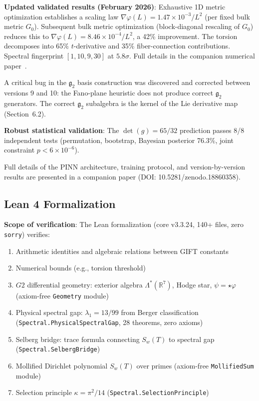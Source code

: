 \documentclass[11pt,a4paper]{article}
\newcommand{\Gtwo}{\mathrm{G}_2}
\def\Gtwo{G2}%
\begin{document}
\textbf{Updated validated results (February 2026)}: Exhaustive 1D metric optimization establishes a scaling law $\nabla\varphi(L) = 1.47 \times 10^{-3}/L^2$ (per fixed bulk metric $G_0$). Subsequent bulk metric optimization (block-diagonal rescaling of $G_0$) reduces this to $\nabla\varphi(L) = 8.46 \times 10^{-4}/L^2$, a 42\% improvement. The torsion decomposes into 65\% $t$-derivative and 35\% fiber-connection contributions. Spectral fingerprint $[1, 10, 9, 30]$ at $5.8\sigma$. Full details in the companion numerical paper~\cite{numerical2026}.

A critical bug in the $\mathfrak{g}_2$ basis construction was discovered and corrected between versions 9 and 10: the Fano-plane heuristic does not produce correct $\mathfrak{g}_2$ generators. The correct $\mathfrak{g}_2$ subalgebra is the kernel of the Lie derivative map (Section~6.2).

\textbf{Robust statistical validation}: The $\det(g) = 65/32$ prediction passes 8/8 independent tests (permutation, bootstrap, Bayesian posterior 76.3\%, joint constraint $p < 6 \times 10^{-6}$).

Full details of the PINN architecture, training protocol, and version-by-version results are presented in a companion paper (DOI: 10.5281/zenodo.18860358).

\subsection{Lean 4 Formalization}

\textbf{Scope of verification}: The Lean formalization (core v3.3.24, 140+ files, zero \texttt{sorry}) verifies:
\begin{enumerate}
\item Arithmetic identities and algebraic relations between GIFT constants
\item Numerical bounds (e.g., torsion threshold)
\item $\Gtwo$ differential geometry: exterior algebra $\Lambda^*(\mathbb{R}^7)$, Hodge star, $\psi = \star\varphi$ (axiom-free \texttt{Geometry} module)
\item Physical spectral gap: $\lambda_1 = 13/99$ from Berger classification (\texttt{Spectral.PhysicalSpectralGap}, 28 theorems, zero axioms)
\item Selberg bridge: trace formula connecting $S_w(T)$ to spectral gap (\texttt{Spectral.SelbergBridge})
\item Mollified Dirichlet polynomial $S_w(T)$ over primes (axiom-free \texttt{MollifiedSum} module)
\item Selection principle $\kappa = \pi^2/14$ (\texttt{Spectral.SelectionPrinciple})
\end{enumerate}
\end{document}
